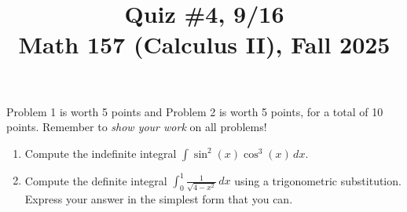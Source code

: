 \documentclass[11pt]{article}
\title{Quiz \#4, 9/16 \\ Math 157 (Calculus II), Fall 2025}
\date{}
\begin{document}
\maketitle

\thispagestyle{empty}

\vspace{-2cm}

Problem 1 is worth 5 points and Problem 2 is worth 5 points, for a total of 10 points. Remember to \emph{show your work} on all problems!

\begin{enumerate}
\item Compute the indefinite integral $\displaystyle \int \sin^2(x) \cos^3(x) \, dx$.

\vspace{8cm}

\item Compute the definite integral $\displaystyle \int_{0}^{1} \frac{1}{\sqrt{4-x^2}} \, dx$ using a trigonometric substitution. \\ Express your answer in the simplest form that you can.

\end{enumerate}
\end{document}
